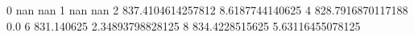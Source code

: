 0 nan nan
1 nan nan
2 837.4104614257812 8.6187744140625
4 828.7916870117188 0.0
6 831.140625 2.34893798828125
8 834.4228515625 5.63116455078125

